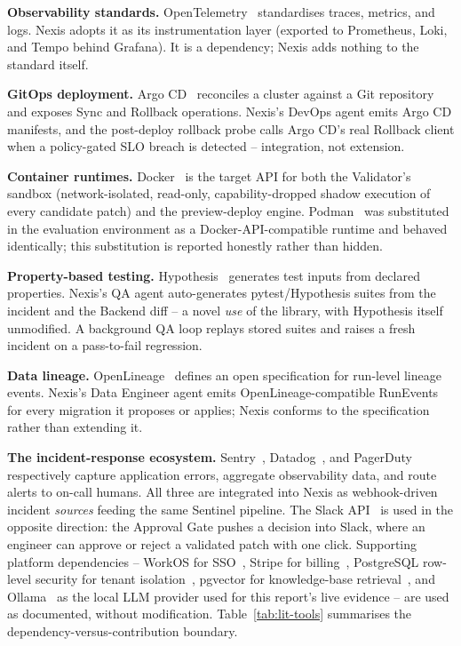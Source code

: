 \textbf{Observability standards.} OpenTelemetry~\cite{otel} standardises
traces, metrics, and logs. Nexis adopts it as its instrumentation layer
(exported to Prometheus, Loki, and Tempo behind Grafana). It is a
dependency; Nexis adds nothing to the standard itself.

\textbf{GitOps deployment.} Argo CD~\cite{argocd} reconciles a cluster
against a Git repository and exposes Sync and Rollback operations. Nexis's
DevOps agent emits Argo CD manifests, and the post-deploy rollback probe
calls Argo CD's real Rollback client when a policy-gated SLO breach is
detected -- integration, not extension.

\textbf{Container runtimes.} Docker~\cite{docker} is the target API for both
the Validator's sandbox (network-isolated, read-only, capability-dropped
shadow execution of every candidate patch) and the preview-deploy engine.
Podman~\cite{podman} was substituted in the evaluation environment as a
Docker-API-compatible runtime and behaved identically; this substitution is
reported honestly rather than hidden.

\textbf{Property-based testing.} Hypothesis~\cite{hypothesis} generates test
inputs from declared properties. Nexis's QA agent auto-generates
pytest/Hypothesis suites from the incident and the Backend diff -- a novel
\emph{use} of the library, with Hypothesis itself unmodified. A background QA
loop replays stored suites and raises a fresh incident on a pass-to-fail
regression.

\textbf{Data lineage.} OpenLineage~\cite{openlineage} defines an open
specification for run-level lineage events. Nexis's Data Engineer agent emits
OpenLineage-compatible RunEvents for every migration it proposes or applies;
Nexis conforms to the specification rather than extending it.

\textbf{The incident-response ecosystem.} Sentry~\cite{sentry},
Datadog~\cite{datadog}, and PagerDuty~\cite{pagerduty} respectively capture
application errors, aggregate observability data, and route alerts to on-call
humans. All three are integrated into Nexis as webhook-driven incident
\emph{sources} feeding the same Sentinel pipeline. The Slack
API~\cite{slackapi} is used in the opposite direction: the Approval Gate
pushes a decision into Slack, where an engineer can approve or reject a
validated patch with one click. Supporting platform dependencies -- WorkOS
for SSO~\cite{workos}, Stripe for billing~\cite{stripe}, PostgreSQL
row-level security for tenant isolation~\cite{pgrls}, pgvector for
knowledge-base retrieval~\cite{pgvector}, and Ollama~\cite{ollama} as the
local LLM provider used for this report's live evidence -- are used as
documented, without modification. Table~\ref{tab:lit-tools} summarises the
dependency-versus-contribution boundary.

